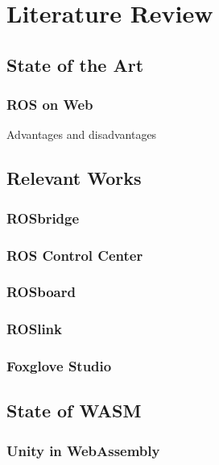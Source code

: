 \chapter{Literature Review}\label{cha:literature}

\section{State of the Art}\label{sec:state}

    \subsection{ROS on Web}\label{sub:ros_on_web}

    Advantages and disadvantages


\section{Relevant Works}

    \subsection{ROSbridge}

    \subsection{ROS Control Center}

    \subsection{ROSboard}

    \subsection{ROSlink}

    \subsection{Foxglove Studio}

\section{State of WASM}

    \subsection{Unity in WebAssembly}

